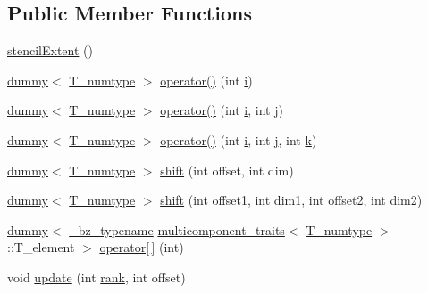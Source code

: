 \subsection*{Public Member Functions}
\begin{DoxyCompactItemize}
\item 
\hyperlink{classstencilExtent_aa1e790dbedebb7e4999e3813dfe38df7}{stencil\+Extent} ()
\item 
\hyperlink{classdummy}{dummy}$<$ \hyperlink{classstencilExtent_a93a97a73c5ca309121de8deb65521b0a}{T\+\_\+numtype} $>$ \hyperlink{classstencilExtent_a9ad049fc2e6f420d3c2211f3056983fb}{operator()} (int \hyperlink{indexexpr_8h_aabd77643995707c185e95c8cb2782c81}{i})
\item 
\hyperlink{classdummy}{dummy}$<$ \hyperlink{classstencilExtent_a93a97a73c5ca309121de8deb65521b0a}{T\+\_\+numtype} $>$ \hyperlink{classstencilExtent_a3fbfb5f9202dbb7d2ab99d86fea23ff7}{operator()} (int \hyperlink{indexexpr_8h_aabd77643995707c185e95c8cb2782c81}{i}, int \hyperlink{indexexpr_8h_aa1f3325d66516548e69238097857fa98}{j})
\item 
\hyperlink{classdummy}{dummy}$<$ \hyperlink{classstencilExtent_a93a97a73c5ca309121de8deb65521b0a}{T\+\_\+numtype} $>$ \hyperlink{classstencilExtent_ab1fca3bc4515ba38ec36a00c4e35238f}{operator()} (int \hyperlink{indexexpr_8h_aabd77643995707c185e95c8cb2782c81}{i}, int \hyperlink{indexexpr_8h_aa1f3325d66516548e69238097857fa98}{j}, int \hyperlink{indexexpr_8h_abb72938a198351550846b37a84588b63}{k})
\item 
\hyperlink{classdummy}{dummy}$<$ \hyperlink{classstencilExtent_a93a97a73c5ca309121de8deb65521b0a}{T\+\_\+numtype} $>$ \hyperlink{classstencilExtent_a71c0e921f77f32d2428a7c6e9fb590fd}{shift} (int offset, int dim)
\item 
\hyperlink{classdummy}{dummy}$<$ \hyperlink{classstencilExtent_a93a97a73c5ca309121de8deb65521b0a}{T\+\_\+numtype} $>$ \hyperlink{classstencilExtent_ad2a78ec35b107a2b250d9be75dec1588}{shift} (int offset1, int dim1, int offset2, int dim2)
\item 
\hyperlink{classdummy}{dummy}$<$ \hyperlink{compiler_8h_a1bc40add3e72effc9cf69dbe445cbdfd}{\+\_\+bz\+\_\+typename} \hyperlink{structmulticomponent__traits}{multicomponent\+\_\+traits}$<$ \hyperlink{classstencilExtent_a93a97a73c5ca309121de8deb65521b0a}{T\+\_\+numtype} $>$\+::T\+\_\+element $>$ \hyperlink{classstencilExtent_a79815df302132656c8996f647269894e}{operator\mbox{[}$\,$\mbox{]}} (int)
\item 
void \hyperlink{classstencilExtent_a423b60ee98472ada39dc1c337bcf54e3}{update} (int \hyperlink{zfftnd_8c_a6cfd95afd0afebd625b889fb6e58371c}{rank}, int offset)

\end{DoxyCompactItemize}
